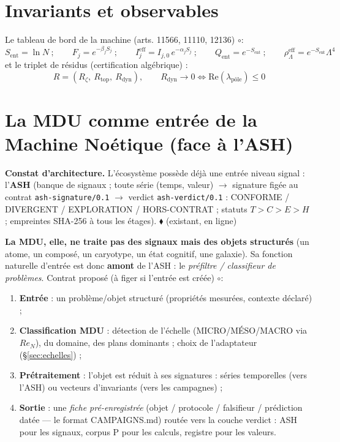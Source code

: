 \documentclass[11pt,a4paper]{article}
\newcommand{\SET}{\ensuremath{\blacklozenge}}
\newcommand{\SCONJ}{\ensuremath{\circ}}
\newcommand{\sent}{S_{\mathrm{ent}}}
\begin{document}
\section{Invariants et observables}

Le tableau de bord de la machine (arts. 11566, 11110, 12136) \SCONJ :
\begin{equation}
\sent = \ln N
\ ;\qquad
F_j = e^{-\beta_j S_j}
\ ;\qquad
I_j^{\mathrm{eff}} = I_{j,0}\,e^{-\alpha_j S_j}
\ ;\qquad
Q_{\mathrm{ent}} = e^{-\sent}
\ ;\qquad
\rho_\Lambda^{\mathrm{eff}} = e^{-\sent}\Lambda^4
\end{equation}
et le triplet de résidus (certification algébrique) :
\begin{equation}
R = (R_\zeta,\ R_{\mathrm{top}},\ R_{\mathrm{dyn}}),
\qquad R_{\mathrm{dyn}} \to 0 \iff \mathrm{Re}(\lambda_{\mathrm{pôle}}) \le 0
\end{equation}

\section{La MDU comme entrée de la Machine Noétique (face à l'ASH)}
\label{sec:entree}

\textbf{Constat d'architecture.} L'écosystème possède déjà une entrée niveau signal : l'\textbf{ASH} (banque de signaux ; toute série (temps, valeur) $\to$ signature figée au contrat \texttt{ash-signature/0.1} $\to$ verdict \texttt{ash-verdict/0.1} : CONFORME / DIVERGENT / EXPLORATION / HORS-CONTRAT ; statuts $T > C > E > H$ ; empreintes SHA-256 à tous les étages). \SET{} (existant, en ligne)

\textbf{La MDU, elle, ne traite pas des signaux mais des objets structurés} (un atome, un composé, un caryotype, un état cognitif, une galaxie). Sa fonction naturelle d'entrée est donc \textbf{amont} de l'ASH : le \emph{préfiltre / classifieur de problèmes}. Contrat proposé (à figer si l'entrée est créée) \SCONJ :

\begin{enumerate}
\item \textbf{Entrée} : un problème/objet structuré (propriétés mesurées, contexte déclaré) ;
\item \textbf{Classification MDU} : détection de l'échelle (MICRO/MÉSO/MACRO via $Re_N$), du domaine, des plans dominants ; choix de l'adaptateur (\S\ref{sec:echelles}) ;
\item \textbf{Prétraitement} : l'objet est réduit à ses signatures : séries temporelles (vers l'ASH) ou vecteurs d'invariants (vers les campagnes) ;
\item \textbf{Sortie} : une \emph{fiche pré-enregistrée} (objet / protocole / falsifieur / prédiction datée --- le format CAMPAIGNS.md) routée vers la couche verdict : ASH pour les signaux, corpus P pour les calculs, registre pour les valeurs.
\end{enumerate}
\end{document}
